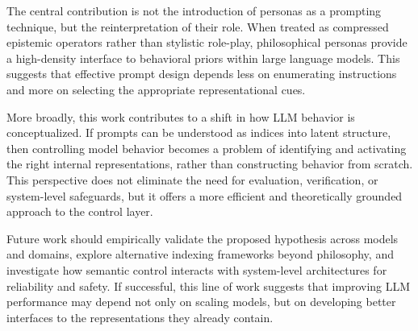 \documentclass[11pt]{article}
\begin{document}
The central contribution is not the introduction of personas as a prompting technique, but the reinterpretation of their role. When treated as compressed epistemic operators rather than stylistic role-play, philosophical personas provide a high-density interface to behavioral priors within large language models. This suggests that effective prompt design depends less on enumerating instructions and more on selecting the appropriate representational cues.

More broadly, this work contributes to a shift in how LLM behavior is conceptualized. If prompts can be understood as indices into latent structure, then controlling model behavior becomes a problem of identifying and activating the right internal representations, rather than constructing behavior from scratch. This perspective does not eliminate the need for evaluation, verification, or system-level safeguards, but it offers a more efficient and theoretically grounded approach to the control layer.

Future work should empirically validate the proposed hypothesis across models and domains, explore alternative indexing frameworks beyond philosophy, and investigate how semantic control interacts with system-level architectures for reliability and safety. If successful, this line of work suggests that improving LLM performance may depend not only on scaling models, but on developing better interfaces to the representations they already contain.



\end{document}
